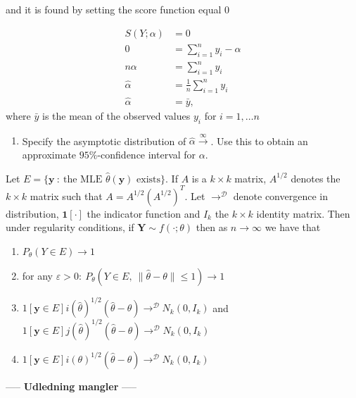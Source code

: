 and it is found by setting the score function equal $0$

\begin{align*}
    S\left(Y; \alpha \right) &= 0\\
    0 &= \sum_{i=1}^n y_i - \alpha\\
    n\alpha &= \sum_{i=1}^n y_i\\
    \hat{\alpha} &= \frac{1}{n} \sum_{i=1}^n y_i \\
    \hat{\alpha} &= \bar{y},
\end{align*}
where $\bar{y}$ is the mean of the observed values $y_i$ for $i = 1, \ldots n$

\begin{enumerate}[resume]
    \item  Specify the asymptotic distribution of $\hat{\alpha}\xrightarrow{\infty}$. Use this to obtain an approximate $95\%$-confidence interval for $\alpha$.
\end{enumerate}

\begin{theorem}\label{th:distribution_ml_estimator}
Let $E = \{\mathbf{y} \ : \ \text{the MLE } \hat{\theta}(\mathbf{y}) \text{ exists}\}$. 
If $A$ is a $k \times k$ matrix, $A^{1/2}$ denotes the $k \times k$ matrix such that $A = A^{1/2}\left( A^{1/2} \right)^T$.
Let $\rightarrow^\mathcal{D}$ denote convergence in distribution, $\mathbf{1}[\cdot]$ the indicator function and $I_k$ the $k \times k$ identity matrix.
Then under regularity conditions, if $\mathbf{Y} \sim f(\cdot;\theta)$ then as $n \rightarrow \infty$ we have that
\begin{enumerate}
    \item $P_\theta(Y \in E) \rightarrow 1$
    \item for any $\varepsilon > 0: \ P_\theta(Y \in E, \ \|\hat{\theta} - \theta\| \leq 1) \rightarrow 1$
    \item $1[\mathbf{y} \in E] i(\hat{\theta})^{1/2}(\hat{\theta} - \theta) \rightarrow^\mathcal{D} N_k(0, I_k)$ and $1[\mathbf{y} \in E] j(\hat{\theta})^{1/2}(\hat{\theta} - \theta) \rightarrow^\mathcal{D} N_k(0, I_k)$
    \item $1[\mathbf{y} \in E] i(\theta)^{1/2}(\hat{\theta} - \theta) \rightarrow^\mathcal{D} N_k(0, I_k)$
\end{enumerate}
\end{theorem}

\begin{center}
-----
\textbf{Udledning mangler}
-----
\end{center}

